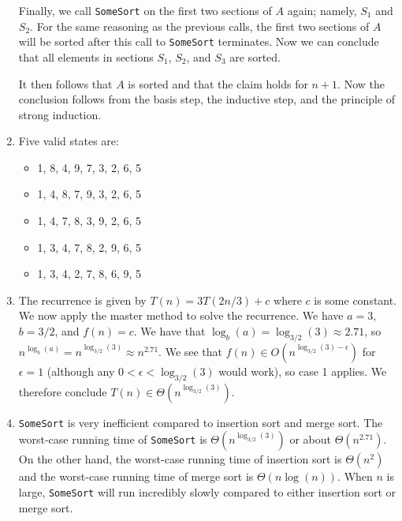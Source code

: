 \documentclass[11pt, letterpaper, titlepage]{article}
\begin{document}
\begin{enumerate}[label=\alph*)]
    Finally, we call \texttt{SomeSort} on the first two sections of $A$ again; namely, $S_1$ and $S_2$. For the same reasoning as the previous calls, the first two sections of $A$ will be sorted after this call to \texttt{SomeSort} terminates. Now we can conclude that all elements in sections $S_1$, $S_2$, and $S_3$ are sorted. 
    
    It then follows that $A$ is sorted and that the claim holds for $n + 1$. Now the conclusion follows from the basis step, the inductive step, and the principle of strong induction.

    \item Five valid states are:
    \begin{itemize}
        \item 1, 8, 4, 9, 7, 3, 2, 6, 5
        \item 1, 4, 8, 7, 9, 3, 2, 6, 5
        \item 1, 4, 7, 8, 3, 9, 2, 6, 5
        \item 1, 3, 4, 7, 8, 2, 9, 6, 5
        \item 1, 3, 4, 2, 7, 8, 6, 9, 5
    \end{itemize}

    \item The recurrence is given by $T(n) = 3T(2n/3) + c$ where $c$ is some constant. We now apply the master method to solve the recurrence. We have $a = 3$, $b = 3/2$, and $f(n) = c$. We have that $\log_b(a) = \log_{3/2}(3) \approx 2.71$, so $n^{\log_b(a)} = n^{\log_{3/2}(3)} \approx n^{2.71}$. We see that $f(n) \in O(n^{\log_{3/2}(3) - \epsilon})$ for $\epsilon = 1$ (although any $0 < \epsilon < \log_{3/2}(3)$ would work), so case 1 applies. We therefore conclude $T(n) \in \Theta(n^{\log_{3/2}(3)})$.
    
    \item \texttt{SomeSort} is very inefficient compared to insertion sort and merge sort. The worst-case running time of \texttt{SomeSort} is $\Theta(n^{\log_{3/2}(3)})$ or about $\Theta(n^{2.71})$. On the other hand, the worst-case running time of insertion sort is $\Theta(n^2)$ and the worst-case running time of merge sort is $\Theta(n\log(n))$. When $n$ is large, \texttt{SomeSort} will run incredibly slowly compared to either insertion sort or merge sort.
\end{enumerate}
\end{document}
